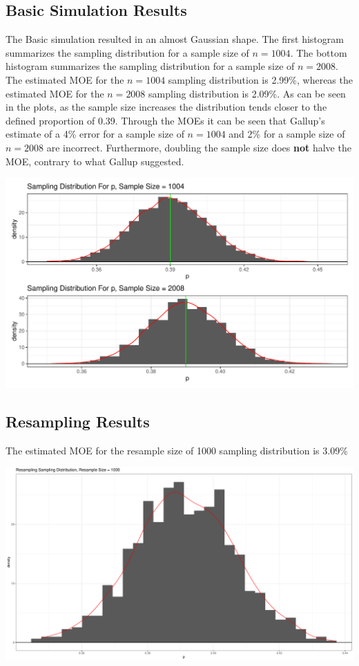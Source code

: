 \documentclass{article}\usepackage[]{graphicx}\usepackage[]{xcolor}
\newenvironment{Figure}
  {\par\medskip\noindent\minipage{\linewidth}}
  {\endminipage\par\medskip}
\begin{document}
\begin{multicols}{2}
\subsection{Basic Simulation Results}
The Basic simulation resulted in an almost Gaussian shape. The first histogram summarizes the sampling distribution for a sample size of $n = 1004$. The bottom histogram summarizes the sampling distribution for a sample size of $n = 2008$. The estimated MOE for the $n = 1004$ sampling distribution is 2.99\%, whereas the estimated MOE for the $n = 2008$ sampling distribution is 2.09\%. As can be seen in the plots, as the sample size increases the distribution tends closer to the defined proportion of 0.39. Through the MOEs it can be seen that Gallup's estimate of a 4\% error for a sample size of $n = 1004$ and 2\% for a sample size of $n = 2008$ are incorrect. Furthermore, doubling the sample size does \textbf{not} halve the MOE, contrary to what Gallup suggested. 

\begin{Figure}
\includegraphics[scale=0.4]{Rplot.pdf}
\label{plot1}
\end{Figure}

\subsection{Resampling Results}
The estimated MOE for the resample size of 1000 sampling distribution is 3.09\%
\begin{center}
\begin{Figure}
\includegraphics[scale=0.25]{Rplot01.pdf}
\label{plot2}
\end{Figure}
\end{center}


\end{multicols}
\end{document}

